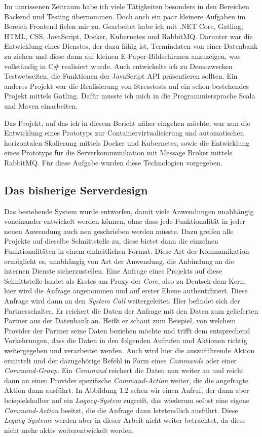 \documentclass[12pt,a4paper]{scrartcl}
\begin{document}
Im umrissenen Zeitraum habe ich viele Tätigkeiten besonders in den Bereichen Backend und Testing übernommen. Doch auch ein paar kleinere Aufgaben im Bereich Frontend fielen mir zu. Gearbeitet habe ich mit .NET Core, Gatling, HTML, CSS, JavaScript, Docker, Kubernetes und RabbitMQ. 
Darunter war die Entwicklung eines Dienstes, der dazu fähig ist, Termindaten von einer Datenbank zu ziehen und diese dann auf kleinen E-Paper-Bildschirmen anzuzeigen, was vollständig in C\# realisiert wurde. Auch entwickelte ich zu Demozwecken Testwebseiten, die Funktionen der JavaScript API präsentieren sollten. Ein anderes Projekt war die Realisierung von Stresstests auf ein schon bestehendes Projekt mittels Gatling. Dafür musste ich mich in die Programmiersprache Scala und Maven einarbeiten. 

Das Projekt, auf das ich in diesem Bericht näher eingehen möchte, war nun die Entwicklung eines Prototyps zur Containervirtualisierung und automatischen horizontalen Skalierung mittels Docker und Kubernetes, sowie die Entwicklung eines Prototyps für die Serverkommunikation mit Message Broker mittels RabbitMQ. Für diese Aufgabe wurden diese Technologien vorgegeben. 

\subsection{Das bisherige Serverdesign}
Das bestehende System wurde entworfen, damit viele Anwendungen unabhängig voneinander entwickelt werden können, ohne dass jede Funktionalität in jeder neuen Anwendung auch neu geschrieben werden müsste. Dazu greifen alle Projekte auf dieselbe Schnittstelle zu, diese bietet dann die einzelnen Funktionalitäten in einem einheitlichen Format. Diese Art der Kommunikation ermöglicht es, unabhängig von Art der Anwendung, die Anbindung an die internen Dienste sicherzustellen. 
Eine Anfrage eines Projekts auf diese Schnittstelle landet als Erstes am Proxy der \emph{Core}, also zu Deutsch dem Kern, hier wird die Anfrage angenommen und auf erster Ebene authentifiziert. Diese Anfrage wird dann an den \emph{System Call} weitergeleitet. Hier befindet sich der Partnerschalter. Er reichert die Daten der Anfrage mit den Daten zum gelieferten Partner aus der Datenbank an. Heißt er schaut zum Beispiel, von welchem Provider der Partner seine Daten beziehen möchte und trifft dem entsprechend Vorkehrungen, dass die Daten in den folgenden Aufrufen und Aktionen richtig weitergegeben und verarbeitet werden. Auch wird hier die auszuführende Aktion ermittelt und der dazugehörige Befehl in Form eines \emph{Commands} oder einer \emph{Command-Group}. 
Ein \emph{Command} reichert die Daten nun weiter an und reicht dann an einen Provider spezifische \emph{Command-Action} weiter, die die angefragte Aktion dann ausführt. In Abbildung 1.2 sehen wir einen Aufruf, der dann aber beispielshalber auf ein \emph{Lagacy-System} zugreift, das wiederum selbst eine eigene \emph{Command-Action} besitzt, die die Anfrage dann letztendlich ausführt. Diese \emph{Legacy-Systeme} werden aber in dieser Arbeit nicht weiter betrachtet, da diese nicht mehr aktiv weiterentwickelt werden.
\end{document}

